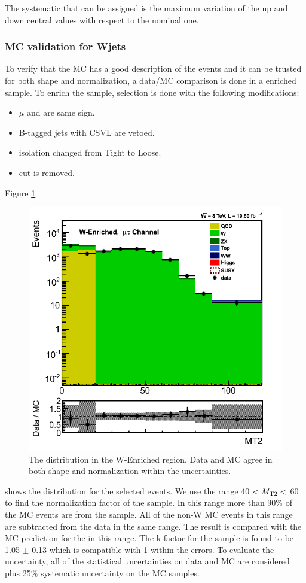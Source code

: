The systematic that can be assigned is the maximum variation of the up and down central values with 
respect to the nominal one. 

\subsubsection{MC validation for Wjets}
To verify that the MC has a good description of the \wjets events and it can be trusted for both shape and normalization, a data/MC comparison 
is done in a \wjets enriched sample. To enrich the sample, \muTau selection is done with the following modifications:
\begin{itemize}
\item $\mu$ and \Tau are same sign.
\item B-tagged jets with CSVL are vetoed.
\item \Tau isolation changed from Tight to Loose.
\item \tauMT cut is removed.
\end{itemize}
Figure \ref{fig:mt2_WValidation} 
\begin{figure}[!Hhtb]
\centering
\includegraphics[angle=0,scale=0.35]{TauTauFigs/MT2_WValidation.png}
\caption{The \mttwo distribution in the W-Enriched region. Data and MC agree in both shape and normalization within the uncertainties.}
\label{fig:mt2_WValidation}
\end{figure}
shows the \mttwo distribution for the selected events. We use the range 40 $<{M_{\rm T2}}<$ 60 \GeV to find the normalization factor of the 
\wjets sample. In this range more than 90\% of the MC events are from the \wjets sample. 
All of the non-W MC events in this range are subtracted from 
the data in the same range. The result is compared with the MC prediction for the \wjets in this range. The k-factor for the \wjets sample is 
found to be 1.05 $\pm$ 0.13 which is compatible with 1 within the errors. To evaluate the uncertainty, 
all of the statistical uncertainties on data and MC are considered plus 25\% systematic uncertainty on the MC samples.

